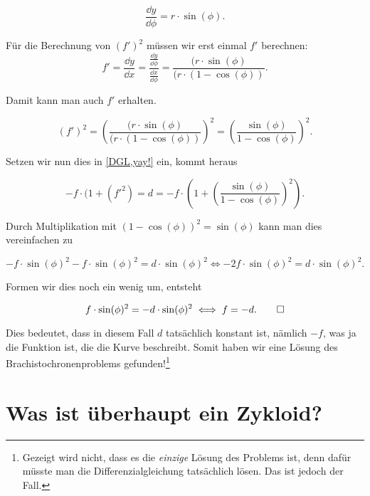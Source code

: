 \begin{equation}
 \frac{\dd y}{\dd \phi} = r \cdot \sin (\phi).
\end{equation}

Für die Berechnung von $(f')^2$ müssen wir erst einmal $f'$ berechnen:
\begin{equation}
 f'= \frac{\dd y}{\dd x}= 
 \frac{\frac{\dd y}{\dd \phi} }{\frac{\dd x}{\dd \phi}} =
 \frac{(r \cdot \sin (\phi)}{(r \cdot (1- \cos (\phi))}.
\end{equation}

Damit kann man auch $f'$ erhalten.

\begin{equation}
 (f')^2= 
 \left(\frac{(r \cdot \sin (\phi)}{(r \cdot (1- \cos (\phi))}\right)^2= 
 \left(\frac{\sin (\phi)}{1-\cos (\phi)}\right) ^2.
\end{equation}

Setzen wir nun dies in \ref{DGL,yay!} ein, kommt heraus

\begin{equation}
 -f \cdot (1+(f'^2) = d = -f \cdot \left(1+\left(\frac{\sin (\phi)}{1-\cos (\phi)}\right) ^2\right).
\end{equation}

Durch Multiplikation mit $(1-\cos (\phi))^2=\sin(\phi)$ kann man dies vereinfachen zu

\begin{equation}
 -f \cdot \sin(\phi)^2 - f \cdot \sin(\phi)^2 = d \cdot \sin(\phi)^2 \iff 
 -2 f \cdot \sin (\phi)^2 = d \cdot \sin(\phi)^2.
\end{equation}

Formen wir dies noch ein wenig um, entsteht

\begin{equation}
 f \cdot \sin (\phi)^2 = -d \cdot \sin(\phi)^2 \iff f = -d. \qedhere
\end{equation}

Dies bedeutet, dass in diesem Fall $d$ tatsächlich konstant ist, nämlich $-f$, was ja die Funktion ist, die die Kurve beschreibt. Somit haben wir eine Lösung des Brachistochronenproblems gefunden!\footnote{Gezeigt wird nicht, dass es die \textit{einzige} Lösung des Problems ist, denn dafür müsste man die Differenzialgleichung tatsächlich lösen. 
Das ist jedoch der Fall.}

\section{Was ist überhaupt ein Zykloid?}


